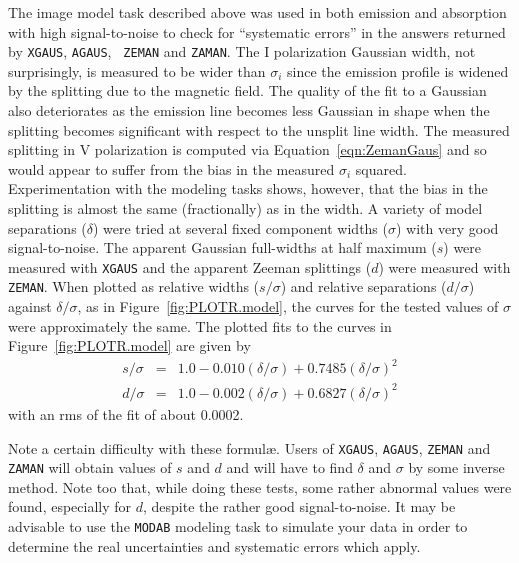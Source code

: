 \documentclass[twoside]{article}
\begin{document}
The image model task described above was used in both emission and
absorption with high signal-to-noise to check for ``systematic
errors'' in the answers returned by {\tt XGAUS}, {\tt AGAUS}, {\tt
  ZEMAN} and {\tt ZAMAN}\@.  The I polarization Gaussian width, not
surprisingly, is measured to be wider than $\sigma_i$ since the
emission profile is widened by the splitting due to the magnetic
field.  The quality of the fit to a Gaussian also deteriorates as the
emission line becomes less Gaussian in shape when the splitting
becomes significant with respect to the unsplit line width.  The
measured splitting in V polarization is computed via
Equation~\ref{eqn:ZemanGaus} and so would appear to suffer from the
bias in the measured $\sigma_i$ squared.  Experimentation with the
modeling tasks shows, however, that the bias in the splitting is
almost the same (fractionally) as in the width.  A variety of model
separations ($\delta$) were tried at several fixed component widths
($\sigma$) with very good signal-to-noise.  The apparent Gaussian
full-widths at half maximum ($s$) were measured with {\tt XGAUS} and
the apparent Zeeman splittings ($d$) were measured with {\tt ZEMAN}\@.
When plotted as relative widths ($s/\sigma$) and relative separations
($d/\sigma$) against $\delta/\sigma$, as in
Figure~\ref{fig:PLOTR.model}, the curves for the tested values of
$\sigma$ were approximately the same.  The plotted fits to the curves
in Figure~\ref{fig:PLOTR.model} are given by
\begin{eqnarray}
  s/\sigma & = & 1.0 - 0.010 (\delta/\sigma) + 0.7485
                 (\delta/\sigma)^2 \\
  d/\sigma & = & 1.0 - 0.002 (\delta/\sigma) + 0.6827
                 (\delta/\sigma)^2
\end{eqnarray}
with an rms of the fit of about 0.0002.

Note a certain difficulty with these formul\ae.  Users of {\tt XGAUS},
{\tt AGAUS}, {\tt ZEMAN} and {\tt ZAMAN} will obtain values of $s$ and
$d$ and will have to find $\delta$ and $\sigma$ by some inverse
method.  Note too that, while doing these tests, some rather abnormal
values were found, especially for $d$, despite the rather good
signal-to-noise.  It may be advisable to use the {\tt MODAB} modeling
task to simulate your data in order to determine the real
uncertainties and systematic errors which apply.
\end{document}
